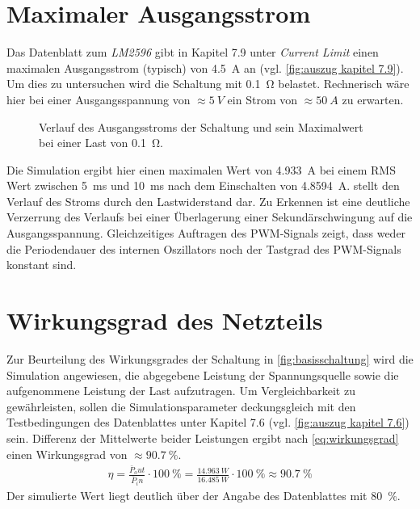 	\section{Maximaler Ausgangsstrom}
		Das Datenblatt zum \textit{LM2596} gibt in Kapitel 7.9 unter \textit{Current Limit} einen maximalen Ausgangsstrom (typisch) von
		\SI{4,5}{A} an (vgl. \cref{fig:auszug kapitel 7.9}). Um dies zu untersuchen wird die Schaltung mit \SI{0,1}{\ohm} belastet.
		Rechnerisch wäre hier bei einer Ausgangsspannung von \(\approx \SI{5}{V}\) ein Strom von \(\approx \SI{50}{A}\) zu erwarten.
		\begin{figure}[h]
			\centering
			
			\caption[Maximaler Ausgangsstrom]{Verlauf des Ausgangsstroms der Schaltung und sein Maximalwert bei einer Last von \SI{0,1}{\ohm}.}
			\label{fig:max ausgangsstrom}
		\end{figure}
		Die Simulation ergibt hier einen maximalen Wert von \SI{4,933}{A} bei einem RMS Wert zwischen \SI{5}{ms} und \SI{10}{ms} nach dem Einschalten von \SI{4.8594}{A}.
		 stellt den Verlauf des Stroms durch den Lastwiderstand dar. Zu Erkennen ist eine deutliche Verzerrung des Verlaufs
		bei einer Überlagerung einer Sekundärschwingung auf die Ausgangsspannung. Gleichzeitiges Auftragen des PWM-Signals zeigt, dass weder die Periodendauer des
		internen Oszillators noch der Tastgrad des PWM-Signals konstant sind.
	\section{Wirkungsgrad des Netzteils}
		Zur Beurteilung des Wirkungsgrades der Schaltung in \cref{fig:basisschaltung} wird die Simulation angewiesen, die abgegebene Leistung der Spannungsquelle sowie
		die aufgenommene Leistung der Last aufzutragen. Um Vergleichbarkeit zu gewährleisten, sollen die Simulationsparameter deckungsgleich mit den Testbedingungen des Datenblattes
		unter Kapitel 7.6 (vgl. \cref{fig:auszug kapitel 7.6}) sein. Differenz der Mittelwerte beider Leistungen ergibt nach \cref{eq:wirkungsgrad} einen Wirkungsgrad von \(\approx \SI{90,7}{\percent}\).
		\begin{align}
			\eta = \frac{\bar{P}_out}{\bar{P}_in} \cdot \SI{100}{\percent} = \frac{\SI{14,963}{W}}{\SI{16,485}{W}} \cdot \SI{100}{\percent} \approx \SI{90,7}{\percent}
			\label{eq:wirkungsgrad}
		\end{align}%
		Der simulierte Wert liegt deutlich über der Angabe des Datenblattes mit \SI{80}{\percent}.
